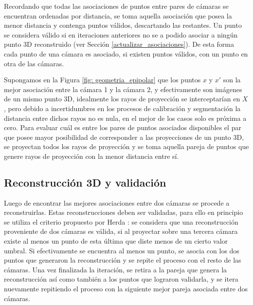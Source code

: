 Recordando que todas las asociaciones de puntos entre pares de cámaras se encuentran ordenadas por distancia, se toma aquella asociación que posea la menor distancia y contenga puntos válidos, descartando las restantes. Un punto se considera válido si en iteraciones anteriores no se a podido asociar a ningún punto 3D reconstruido (ver Sección \ref{actualizar_asociaciones}).
De esta forma cada punto de una cámara es asociado, si existen puntos válidos, con un punto en otra de las cámaras.


 Supongamos en la Figura \ref{fig: geometria_epipolar} que los puntos $x$ y $x'$ son la mejor asociación entre la cámara 1 y la cámara 2, y efectivamente son imágenes de un mismo punto 3D, idealmente los rayos de proyección se interceptarían en $X$, pero debido a incertidumbres en los procesos de calibración y segmentación la distancia entre dichos rayos no es nula, en el mejor de los casos solo es próxima a cero. 
Para evaluar cuál es entre los pares de puntos asociados disponibles el par que posee mayor posibilidad de corresponder a las proyecciones de un punto 3D, se proyectan todos los rayos de proyección y se toma aquella pareja de puntos que genere rayos de proyección con la menor distancia entre sí.


\subsection{Reconstrucción 3D y validación}\label{seccion_reconstruccion3D_validacion}


Luego de encontrar las mejores asociaciones entre dos cámaras se procede a reconstruirlas. Estas reconstrucciones deben ser validadas, para ello en principio se utiliza el  criterio propuesto por Herda \cite{herda}: se considera que una reconstrucción proveniente de dos cámaras es válida, si al proyectar sobre una tercera cámara existe al menos un punto de esta última que diste menos de un cierto valor umbral. Si efectivamente se encuentra al menos un punto, se asocia con los dos puntos que generaron la reconstrucción y se repite el proceso con el resto de las cámaras. Una vez finalizada la iteración, se retira a la pareja que genera la reconstrucción así como también a los puntos que lograron validarla, y se itera nuevamente repitiendo el proceso con la siguiente mejor pareja asociada entre dos cámaras. \\ 



